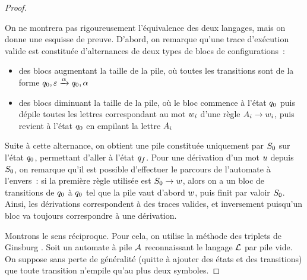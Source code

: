 \begin{proof}
\begin{itemize}
\begin{itemize}
    \end{itemize}
  \end{itemize}
  On ne montrera pas rigoureusement l'équivalence des deux langages, mais on
  donne une esquisse de preuve. D'abord,
  on remarque qu'une trace d'exécution valide est constituée d'alternances de
  deux types de blocs de configurations~:
  \begin{itemize}
  \item des blocs augmentant la taille de la pile, où toutes les transitions
    sont de la forme $q_{0},\varepsilon \xrightarrow{\alpha}q_{0},\alpha$
  \item des blocs diminuant la taille de la pile, où le bloc commence à l'état
    $q_{0}$ puis dépile toutes les lettres correspondant au mot $w_i$
    d'une règle $A_i \to w_i$, puis revient à l'état $q_{0}$ en
    empilant la lettre $A_i$
  \end{itemize}
  Suite à cette alternance, on obtient une pile constituée uniquement par
  $S_{0}$ sur l'état $q_{0}$, permettant d'aller à l'état $q_{f}$. Pour une
  dérivation d'un mot $u$ depuis $S_{0}$, on remarque qu'il est possible
  d'effectuer le parcours de l'automate à l'envers~: si la première règle
  utilisée est $S_{0} \to w$, alors on a un bloc de transitions de $q_{0}$
  à $q_{0}$ tel que la pile vaut d'abord $w$, puis finit par valoir
  $S_{0}$. Ainsi, les dérivations correspondent à des traces valides, et
  inversement puisqu'un bloc va toujours correspondre à une dérivation.

  Montrons le sens réciproque. Pour cela, on utilise la méthode des triplets de
  Ginsburg \cite{Ginsburg1966}. Soit un automate à pile $\mathcal{A}$
  reconnaissant le langage $\mathcal L$ par pile vide. On suppose sans perte de
  généralité (quitte à ajouter des états et des transitions) que toute
  transition n'empile qu'au plus deux symboles.


\end{proof}
